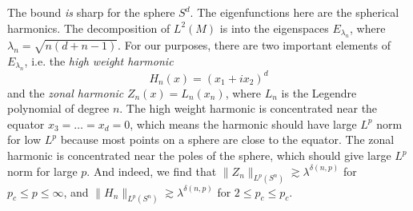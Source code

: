 \documentclass{article}
\theoremstyle{plain}
\theoremstyle{remark}
\theoremstyle{definition}
\begin{document}
The bound \emph{is} sharp for the sphere $S^d$. The eigenfunctions here are the spherical harmonics. The decomposition of $L^2(M)$ is into the eigenspaces $E_{\lambda_n}$, where $\lambda_n = \sqrt{n(d+n-1)}$. For our purposes, there are two important elements of $E_{\lambda_n}$, i.e. the \emph{high weight harmonic}
%
\[ H_n(x) = (x_1 + ix_2)^d \] 
%
and the \emph{zonal harmonic} $Z_n(x) = L_n(x_n)$, where $L_n$ is the Legendre polynomial of degree $n$. The high weight harmonic is concentrated near the equator $x_3 = \dots = x_d = 0$, which means the harmonic should have large $L^p$ norm for low $L^p$ because most points on a sphere are close to the equator. The zonal harmonic is concentrated near the poles of the sphere, which should give large $L^p$ norm for large $p$. And indeed, we find that $\| Z_n \|_{L^p(S^n)} \gtrsim \lambda^{\delta(n,p)}$ for $p_c \leq p \leq \infty$, and $\| H_n \|_{L^p(S^n)} \gtrsim \lambda^{\delta(n,p)}$ for $2 \leq p_c \leq p_c$.

%
%
%
%
\end{document}
